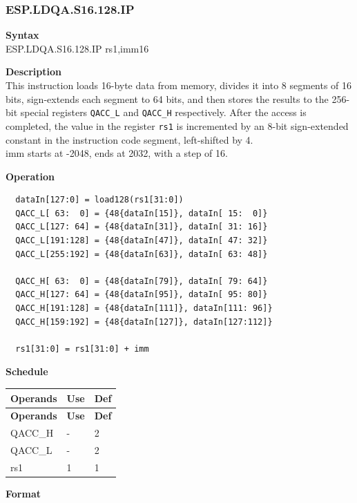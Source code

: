 \newpage
\subsubsection{ESP.LDQA.S16.128.IP}\label{instruction:ESPLDQAS16128IP}
\textbf{Syntax}\\
ESP.LDQA.S16.128.IP rs1,imm16

\textbf{Description}\\
This instruction loads 16-byte data from memory, divides it into 8 segments of 16 bits, sign-extends each segment to 64 bits, and then stores the results to the 256-bit special registers \lstinline{QACC_L} and \lstinline{QACC_H} respectively. After the access is completed, the value in the register \lstinline{rs1} is incremented by an 8-bit sign-extended constant in the instruction code segment, left-shifted by 4.\\

imm starts at -2048, ends at 2032, with a step of 16.

\textbf{Operation}
\begin{lstlisting}
  dataIn[127:0] = load128(rs1[31:0])
  QACC_L[ 63:  0] = {48{dataIn[15]}, dataIn[ 15:  0]}
  QACC_L[127: 64] = {48{dataIn[31]}, dataIn[ 31: 16]}
  QACC_L[191:128] = {48{dataIn[47]}, dataIn[ 47: 32]}
  QACC_L[255:192] = {48{dataIn[63]}, dataIn[ 63: 48]}

  QACC_H[ 63:  0] = {48{dataIn[79]}, dataIn[ 79: 64]}
  QACC_H[127: 64] = {48{dataIn[95]}, dataIn[ 95: 80]}
  QACC_H[191:128] = {48{dataIn[111]}, dataIn[111: 96]}
  QACC_H[159:192] = {48{dataIn[127]}, dataIn[127:112]}

  rs1[31:0] = rs1[31:0] + imm
\end{lstlisting}

\textbf{Schedule}\\
\begin{longtable}[c]{|l|l|l|}
    \hline
    \rowcolor{lightgray}
    \textbf{Operands} & \textbf{Use} & \textbf{Def} \\\hline
    \endfirsthead
    \hline
    \rowcolor{lightgray}
     \textbf{Operands} & \textbf{Use} & \textbf{Def} \\\hline
    \endhead
    \hline
    \endfoot

  QACC\_H & - & 2 \\\hline
    QACC\_L & - & 2 \\\hline
  rs1 & 1 & 1

\end{longtable}

\textbf{Format}\\

